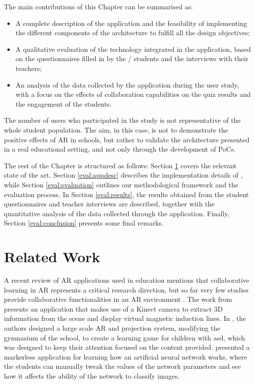 The main contributions of this Chapter can be summarised as:
\begin{itemize}
    \item A complete description of the application and the feasibility of implementing the different components of the \arch{} architecture to fulfill all the design objectives;
    \item A qualitative evaluation of the technology integrated in the application, based on the questionnaires filled in by the \numstudents/ students and the interviews with their teachers;
    \item An analysis of the data collected by the application during the user study, with a focus on the effects of collaboration capabilities on the quiz results and the engagement of the students.
\end{itemize}

The number of users who participated in the study is not representative of the whole student population. The aim, in this case, is not to demonstrate the positive effects of AR in schools, but rather to validate the architecture presented in a real educational setting, and not only through the development of PoCs.

The rest of the Chapter is structured as follows: Section \ref{eval:related} covers the relevant state of the art.
Section \ref{eval:appdesc} describes the implementation details of \appname{}, while Section \ref{eval:evaluation} outlines our methodological framework and the evaluation process.
In Section \ref{eval:results}, the results obtained from the student questionnaires and teacher interviews are described, together with the quantitative analysis of the data collected through the application.
Finally, Section \ref{eval:conclusion} presents some final remarks. 

\section{Related Work}\label{eval:related}

A recent review of AR applications used in education \citep{eleniiattro} mentions that collaborative learning in AR represents a critical research direction, but so far very few studies provide collaborative functionalities in an AR environment \citep{9645428, choi2017arclassnote}.
The work from \cite{cai2017applications} presents an application that makes use of a Kinect camera to extract 3D information from the scene and display virtual magnetic induction lines.
In \citep{takahashi2018empathic}, the authors designed a large scale AR and projection system, modifying the gymnasium of the school, to create a learning game for children with \gls{asd}, which was designed to keep their attention focused on the content provided.
\cite{laviole2018nectar} presented a markerless application for learning how an artificial neural network works, where the students can manually tweak the values of the network parameters and see how it affects the ability of the network to classify images.

